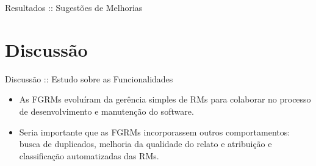 \documentclass[t,14pt,mathserif]{beamer}
\begin{document}
\begin{frame}{Resultados :: Sugestões de Melhorias}

\begin{table}[htpb]
\centering
{}
\caption{Ordenamento das sugestões pelo grau de dificuldade.}
\label{tab:ranking_implementacao_sug_melhorias}
\end{table}

\end{frame}

\section{Discussão}

\begin{frame}{Discussão :: Estudo sobre as Funcionalidades}
    \begin{itemize}

        \item As FGRMs evoluíram da gerência simples de RMs para colaborar no
            processo de desenvolvimento e manutenção do software.

        \item Seria importante que as FGRMs incorporassem outros comportamentos:
              busca de duplicados, melhoria da qualidade do relato e atribuição
              e classificação automatizadas das RMs.

    \end{itemize}
\end{frame}
\end{document}

